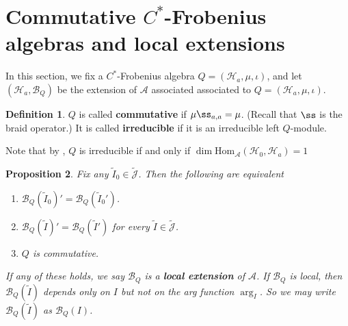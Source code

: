 \documentclass[11pt,b5paper,notitlepage]{article}
\theoremstyle{definition}
\newtheorem{df}{Definition}[section]
\theoremstyle{plain}
\newtheorem{pp}[df]{Proposition}
\newcommand{\mc}{\mathcal}
\newcommand{\wtd}{\widetilde}
\newcommand{\Hom}{\mathrm{Hom}}
\newcommand{\Jtd}{\widetilde{\mathcal J}}
\numberwithin{equation}{section}
\begin{document}
\section{Commutative $C^*$-Frobenius algebras and local extensions}\label{lb19}

In this section, we fix a $C^*$-Frobenius algebra $Q=(\mc H_a,\mu,\iota)$, and let $(\mc H_a,\mc B_Q)$ be the extension of $\mc A$ associated associated to $Q=(\mc H_a,\mu,\iota)$.

\begin{df}
$Q$ is called \textbf{commutative} if $\mu\ss_{a,a}=\mu$. (Recall that $\ss$ is the braid operator.) It is called \textbf{irreducible} if it is an irreducible left $Q$-module.
\end{df}

Note that by \cite[Rem. 2.7]{NY18}, $Q$ is irreducible if and only if $\dim\Hom_{\mc A}(\mc H_0,\mc H_a)=1$





\begin{pp}\label{lb21}
Fix any $\wtd I_0\in\Jtd$. Then the following are equivalent
\begin{enumerate}[label=(\arabic*)]
\item $\mc B_Q(\wtd I_0)'=\mc B_Q(\wtd I_0')$.
\item $\mc B_Q(\wtd I)'=\mc B_Q(\wtd I')$ for every $\wtd I\in\Jtd$.
\item $Q$ is commutative. 
\end{enumerate}
If any of these holds, we say $\mc B_Q$ is a \textbf{local extension} of $\mc A$. If $\mc B_Q$ is local, then $\mc B_Q(\wtd I)$ depends only on $I$ but not on the arg function $\arg_I$. So we may write $\mc B_Q(\wtd I)$ as $\mc B_Q(I)$.
\end{pp}
\end{document}
